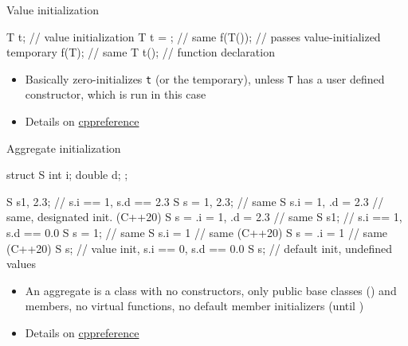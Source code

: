 \begin{frame}[fragile]
  \begin{block}{Value initialization}
    \begin{cppcode}
      T t{};    // value initialization
      T t = {}; // same
      f(T());   // passes value-initialized temporary
      f(T{});   // same
      T t();    // function declaration
    \end{cppcode}
    \begin{itemize}
      \item Basically zero-initializes \texttt{t} (or the temporary), unless \texttt{T} has a user defined constructor, which is run in this case
      \item Details on \href{https://en.cppreference.com/w/cpp/language/value_initialization}{cppreference}
    \end{itemize}
  \end{block}
\end{frame}

\begin{frame}[fragile,shrink=10]
  \begin{block}{Aggregate initialization}
    \begin{cppcode}
      struct S { int i; double d; };

      S s{1, 2.3};             // s.i == 1, s.d == 2.3
      S s = {1, 2.3};          // same
      S s{.i = 1, .d = 2.3}    // same, designated init. (C++20)
      S s = {.i = 1, .d = 2.3} // same
      S s{1};        // s.i == 1, s.d == 0.0
      S s = {1};     // same
      S s{.i = 1}    // same (C++20)
      S s = {.i = 1} // same (C++20)
      S s{}; // value init, s.i == 0, s.d == 0.0
      S s;   // default init, undefined values
    \end{cppcode}
    \begin{itemize}
      \item An aggregate is a class with no constructors, only public base classes () and members, no virtual functions, no default member initializers (until )
      \item Details on \href{https://en.cppreference.com/w/cpp/language/aggregate_initialization}{cppreference}
    \end{itemize}
  \end{block}
\end{frame}

